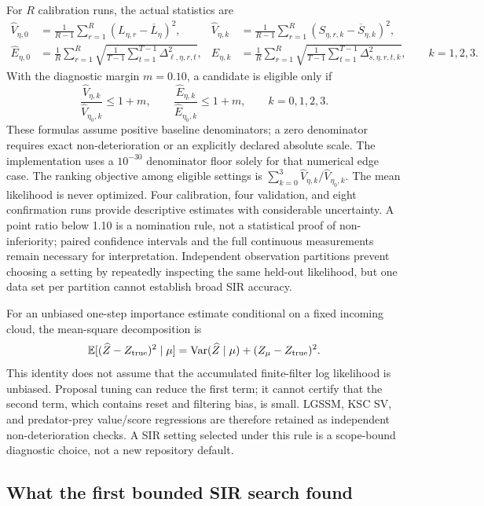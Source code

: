 For $R$ calibration runs, the actual statistics are
\begin{align}
 \widehat V_{\eta,0}
 &=\frac{1}{R-1}\sum_{r=1}^R(L_{\eta,r}-\overline L_\eta)^2,
 &\widehat V_{\eta,k}
 &=\frac{1}{R-1}\sum_{r=1}^R(S_{\eta,r,k}-\overline S_{\eta,k})^2,\\
 \widehat E_{\eta,0}
 &=\frac1R\sum_{r=1}^R
   \sqrt{\frac{1}{T-1}\sum_{t=1}^{T-1}\Delta_{\ell,\eta,r,t}^2},
 &\widehat E_{\eta,k}
 &=\frac1R\sum_{r=1}^R
   \sqrt{\frac{1}{T-1}\sum_{t=1}^{T-1}\Delta_{s,\eta,r,t,k}^2},
 \qquad k=1,2,3.
\end{align}
With the diagnostic margin $m=0.10$, a candidate is eligible only if
\[
 \frac{\widehat V_{\eta,k}}{\widehat V_{\eta_0,k}}\leq1+m,
 \qquad
 \frac{\widehat E_{\eta,k}}{\widehat E_{\eta_0,k}}\leq1+m,
 \qquad k=0,1,2,3.
\]
These formulas assume positive baseline denominators; a zero denominator
requires exact non-deterioration or an explicitly declared absolute scale.
The implementation uses a $10^{-30}$ denominator floor solely for that
numerical edge case.  The ranking objective among eligible settings is
$\sum_{k=0}^3\widehat V_{\eta,k}/\widehat V_{\eta_0,k}$.
The mean likelihood is never optimized.  Four calibration, four validation,
and eight confirmation runs provide descriptive estimates with considerable
uncertainty.  A point ratio below 1.10 is a nomination rule, not a statistical
proof of non-inferiority; paired confidence intervals and the full continuous
measurements remain necessary for interpretation.  Independent observation
partitions prevent choosing a setting by repeatedly inspecting the same
held-out likelihood, but one data set per partition cannot establish broad
SIR accuracy.

For an unbiased one-step importance estimate conditional on a fixed incoming
cloud, the mean-square decomposition is
\[
 \mathbb E[(\widehat Z-Z_{\rm true})^2\mid\mu]
 =
 \operatorname{Var}(\widehat Z\mid\mu)
 +(Z_\mu-Z_{\rm true})^2.
\]
This identity does not assume that the accumulated finite-filter log likelihood
is unbiased. Proposal tuning can reduce the first term; it cannot certify that the second
term, which contains reset and filtering bias, is small.  LGSSM, KSC SV, and
predator-prey value/score regressions are therefore retained as independent
non-deterioration checks.  A SIR setting selected under this rule is a
scope-bound diagnostic choice, not a new repository default.

\subsection{What the first bounded SIR search found}

